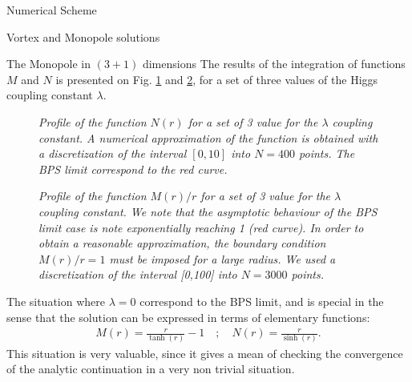 \begin{section}{Numerical Scheme}
\begin{subsection}{Vortex and Monopole solutions}
\begin{subsubsection}{The Monopole in $(3+1)$ dimensions}
      The results of the integration of functions $M$ and $N$ is
      presented on Fig. \ref{fig:2d_monopole_f} and
      \ref{fig:2d_monopole_h}, for a set of three values of the Higgs
      coupling constant $\lambda$.
      \begin{figure}[!ht]
        \begin{center}
          
          \caption{\em Profile of the function $N(r)$ for a set of 3
            value for the $\lambda$ coupling constant. A numerical
            approximation of the function is obtained with a
            discretization of the interval $[0,10]$ into $N = 400$
            points. The BPS limit correspond to the red curve.}
          \label{fig:2d_monopole_f}
        \end{center}
      \end{figure}

      \begin{figure}[!ht]
        \begin{center}
          
          \caption{\em Profile of the function $M(r)/r$ for a set of 3
            value for the $\lambda$ coupling constant.  We note that
            the asymptotic behaviour of the BPS limit case is note
            exponentially reaching 1 (red curve). In order to obtain a
            reasonable approximation, the boundary condition $M(r)/r =
            1$ must be imposed for a large radius. We used a
            discretization of the interval [0,100] into $N=3000$
            points.}
          \label{fig:2d_monopole_h}
        \end{center}
      \end{figure}
      The situation where $\lambda = 0$ correspond to the BPS limit,
      and is special in the sense that the solution can be expressed
      in terms of elementary functions:
      \begin{align}
        M(r) = \frac{r}{\tanh(r)}-1\quad ; \quad N(r) = \frac{r}{\sinh(r)}.
      \end{align}
      This situation is very valuable, since it gives a mean of
      checking the convergence of the analytic continuation in a
      very non trivial situation.
    \end{subsubsection}
  \end{subsection}
\end{section}
